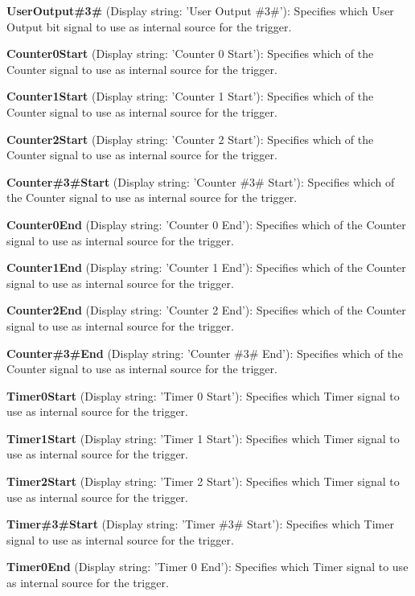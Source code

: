 \begin{DoxyItemize}
\item {\bfseries User\+Output\#3\#} (Display string\+: 'User Output \#3\#')\+: Specifies which User Output bit signal to use as internal source for the trigger.
\item {\bfseries Counter0\+Start} (Display string\+: 'Counter 0 Start')\+: Specifies which of the Counter signal to use as internal source for the trigger.
\item {\bfseries Counter1\+Start} (Display string\+: 'Counter 1 Start')\+: Specifies which of the Counter signal to use as internal source for the trigger.
\item {\bfseries Counter2\+Start} (Display string\+: 'Counter 2 Start')\+: Specifies which of the Counter signal to use as internal source for the trigger.
\item {\bfseries Counter\#3\#Start} (Display string\+: 'Counter \#3\# Start')\+: Specifies which of the Counter signal to use as internal source for the trigger.
\item {\bfseries Counter0\+End} (Display string\+: 'Counter 0 End')\+: Specifies which of the Counter signal to use as internal source for the trigger.
\item {\bfseries Counter1\+End} (Display string\+: 'Counter 1 End')\+: Specifies which of the Counter signal to use as internal source for the trigger.
\item {\bfseries Counter2\+End} (Display string\+: 'Counter 2 End')\+: Specifies which of the Counter signal to use as internal source for the trigger.
\item {\bfseries Counter\#3\#End} (Display string\+: 'Counter \#3\# End')\+: Specifies which of the Counter signal to use as internal source for the trigger.
\item {\bfseries Timer0\+Start} (Display string\+: 'Timer 0 Start')\+: Specifies which Timer signal to use as internal source for the trigger.
\item {\bfseries Timer1\+Start} (Display string\+: 'Timer 1 Start')\+: Specifies which Timer signal to use as internal source for the trigger.
\item {\bfseries Timer2\+Start} (Display string\+: 'Timer 2 Start')\+: Specifies which Timer signal to use as internal source for the trigger.
\item {\bfseries Timer\#3\#Start} (Display string\+: 'Timer \#3\# Start')\+: Specifies which Timer signal to use as internal source for the trigger.
\item {\bfseries Timer0\+End} (Display string\+: 'Timer 0 End')\+: Specifies which Timer signal to use as internal source for the trigger.

\end{DoxyItemize}
